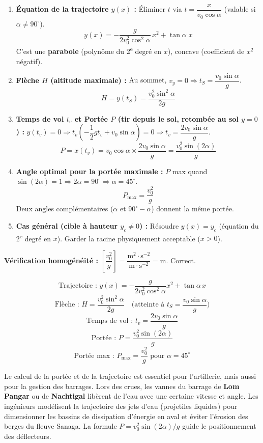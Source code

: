 \documentclass[11pt]{article}
\begin{document}
\begin{methode}
\begin{enumerate}
\item \textbf{Équation de la trajectoire $y(x)$ :} Éliminer $t$ via $t=\dfrac{x}{v_0\cos\alpha}$ (valable si $\alpha\neq 90^{\circ}$).
\[ y(x)=-\dfrac{g}{2v_0^2\cos^2\alpha}\,x^2+\tan\alpha\; x \]
C'est une \textbf{parabole} (polynôme du 2\textsuperscript{e} degré en $x$), concave (coefficient de $x^2$ négatif).
\item \textbf{Flèche $H$ (altitude maximale) :} Au sommet, $v_y=0 \Rightarrow t_S=\dfrac{v_0\sin\alpha}{g}$.
\[ H = y(t_S) = \dfrac{v_0^2\sin^2\alpha}{2g} \]
\item \textbf{Temps de vol $t_v$ et Portée $P$ (tir depuis le sol, retombée au sol $y=0$) :}
$y(t_v)=0 \Rightarrow t_v\left(-\dfrac{1}{2}gt_v+v_0\sin\alpha\right)=0 \Rightarrow t_v=\dfrac{2v_0\sin\alpha}{g}$.
\[ P = x(t_v) = v_0\cos\alpha \times \dfrac{2v_0\sin\alpha}{g} = \dfrac{v_0^2\sin(2\alpha)}{g} \]
\item \textbf{Angle optimal pour la portée maximale :} $P$ max quand $\sin(2\alpha)=1 \Rightarrow 2\alpha=90^{\circ} \Rightarrow \boxed{\alpha=45^{\circ}}$.
\[ P_{\max}=\dfrac{v_0^2}{g} \]
Deux angles complémentaires ($\alpha$ et $90^{\circ}-\alpha$) donnent la même portée.
\item \textbf{Cas général (cible à hauteur $y_c \neq 0$) :} Résoudre $y(x)=y_c$ (équation du 2\textsuperscript{e} degré en $x$). Garder la racine physiquement acceptable ($x>0$).
\end{enumerate}
\textbf{Vérification homogénéité :} $\left[\dfrac{v_0^2}{g}\right]=\dfrac{\text{m}^2\cdot\text{s}^{-2}}{\text{m}\cdot\text{s}^{-2}}=\text{m}$. Correct.
\end{methode}

\begin{aretenir}
\[ \text{Trajectoire : } y(x)=-\frac{g}{2v_0^2\cos^2\alpha}x^2+\tan\alpha\, x \]
\[ \text{Flèche : } H=\frac{v_0^2\sin^2\alpha}{2g} \quad \text{(atteinte à } t_S=\frac{v_0\sin\alpha}{g}\text{)} \]
\[ \text{Temps de vol : } t_v=\frac{2v_0\sin\alpha}{g} \]
\[ \text{Portée : } P=\frac{v_0^2\sin(2\alpha)}{g} \]
\[ \text{Portée max : } P_{\max}=\frac{v_0^2}{g} \text{ pour } \alpha=45^{\circ} \]
\end{aretenir}

\begin{savaistu}
Le calcul de la portée et de la trajectoire est essentiel pour l'artillerie, mais aussi pour la gestion des barrages. Lors des crues, les vannes du barrage de \textbf{Lom Pangar} ou de \textbf{Nachtigal} libèrent de l'eau avec une certaine vitesse et angle. Les ingénieurs modélisent la trajectoire des jets d'eau (projetiles liquides) pour dimensionner les bassins de dissipation d'énergie en aval et éviter l'érosion des berges du fleuve Sanaga. La formule $P=v_0^2\sin(2\alpha)/g$ guide le positionnement des déflecteurs.
\end{savaistu}
\end{document}
